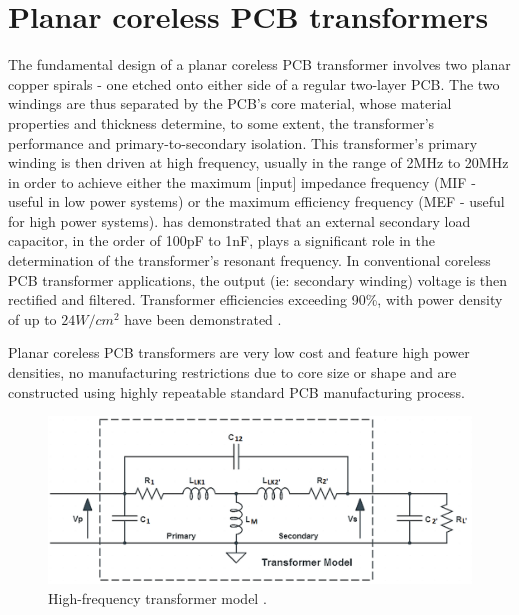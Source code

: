 \documentclass[conference]{IEEEtran}
\begin{document}
\section{Planar coreless PCB transformers}

The fundamental design of a planar coreless PCB transformer involves two planar copper spirals - one etched onto either side of a regular two-layer PCB.  The two windings are thus separated by the PCB's core material, whose material properties and thickness determine, to some extent, the transformer's performance and primary-to-secondary isolation.  This transformer's primary winding is then driven at high frequency, usually in the range of 2MHz to 20MHz in order to achieve either the maximum [input] impedance frequency (MIF - useful in low power systems) or the maximum efficiency frequency (MEF - useful for high power systems).  \cite{TangHuiFundamental} has demonstrated that an external secondary load capacitor, in the order of 100pF to 1nF, plays a significant role in the determination of the transformer's resonant frequency.  In conventional coreless PCB transformer applications, the output (ie: secondary winding) voltage is then rectified and filtered.  Transformer efficiencies exceeding 90\%, with power density of up to $ 24W/cm^{2} $ have been demonstrated \cite{TangHuiFundamental}.

Planar coreless PCB transformers are very low cost and feature high power densities, no manufacturing restrictions due to core size or shape and are constructed using highly repeatable standard PCB manufacturing process. 

\begin{figure}[t]
	\centering
	\includegraphics[width=1\columnwidth]{./img/HF_Model}
	\caption{High-frequency transformer model \cite{TangHuiFundamental}.}
	\label{fig:HF-Model}
\end{figure}
\end{document}
